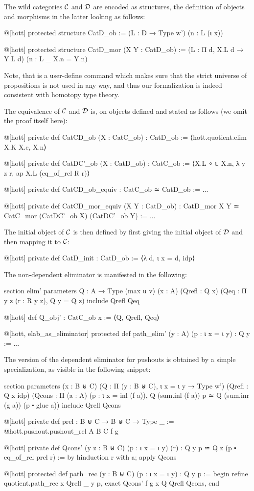 The wild categories $\mathcal C$ and $\mathcal D$ are encoded as structures, the definition
of objects and morphisms in the latter looking as follows:
\begin{leancode}
@[hott] protected structure CatD_ob :=
  (L : D → Type w')
  (n : L (ι x))

@[hott] protected structure CatD_mor (X Y : CatD_ob) :=
  (L : Π d, X.L d → Y.L d)
  (n : L _ X.n = Y.n)
\end{leancode}
Note, that  is a user-define command which makes sure that the
strict universe of propositions is not used in any way, and thus our
formalization is indeed consistent with homotopy type theory.

The equivalence of $\mathcal C$ and $\mathcal D$ is, on objects defined and stated as
follows (we omit the proof itself here):
\begin{leancode}
@[hott] private def CatCD_ob (X : CatC_ob) : CatD_ob :=
⟨hott.quotient.elim X.K X.c, X.n⟩

@[hott] private def CatDC'_ob (X : CatD_ob) : CatC_ob :=
⟨X.L ∘ ι, X.n, λ y z r, ap X.L (eq_of_rel R r)⟩

@[hott] private def CatCD_ob_equiv : CatC_ob ≃ CatD_ob := ...

@[hott] private def CatCD_mor_equiv (X Y : CatD_ob)
  : CatD_mor X Y ≃ CatC_mor (CatDC'_ob X) (CatDC'_ob Y) := ...
\end{leancode}
The initial object of $\mathcal C$ is then defined by first giving the initial
object of $\mathcal D$ and then mapping it to $\mathcal C$:
\begin{leancode}
@[hott] private def CatD_init : CatD_ob := ⟨λ d, ι x = d, idp⟩
\end{leancode}

The non-dependent eliminator is manifested in the following:
\begin{leancodebr}
section elim'
parameters {Q : A → Type (max u v)}
  (x : A)
  (Qrefl : Q x)
  (Qeq : Π y z (r : R y z), Q y = Q z)
include Qrefl Qeq

@[hott] def Q_obj' : CatC_ob x := ⟨Q, Qrefl, Qeq⟩

@[hott, elab_as_eliminator] protected def path_elim' (y : A) (p : ι x = ι y)
  : Q y := ...
\end{leancodebr}

The version of the dependent eliminator for pushouts is obtained by a simple
specialization, as visible in the following snippet:
\begin{leancodebr}
section
  parameters (x : B ⊎ C)
    (Q : Π (y : B ⊎ C), ι x = ι y →  Type w')
    (Qrefl : Q x idp)
    (Qcons : Π (a : A) (p : ι x = inl (f a)), 
      Q (sum.inl (f a)) p ≃ Q (sum.inr (g a)) (p ⬝ glue a))
  include Qrefl Qcons

@[hott] private def prel : B ⊎ C → B ⊎ C → Type _ := 
@hott.pushout.pushout_rel A B C f g

@[hott] private def Qcons' (y z : B ⊎ C) (p : ι x = ι y) (r)
  : Q y p ≃ Q z (p ⬝ eq_of_rel prel r) :=
by { hinduction r with a; apply Qcons }

@[hott] protected def path_rec (y : B ⊎ C) (p : ι x = ι y) : Q y p :=
begin
  refine quotient.path_rec x Qrefl _ y p,
  exact Qcons' f g x Q Qrefl Qcons,
end
\end{leancodebr}

